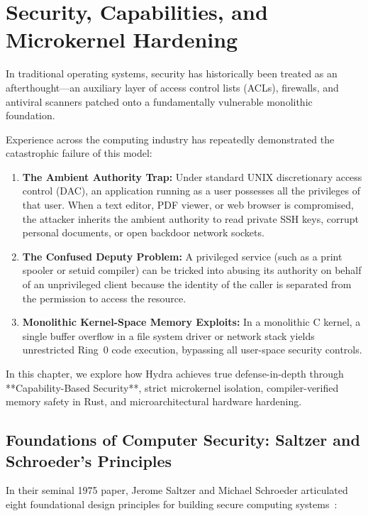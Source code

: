 \chapter{Security, Capabilities, and Microkernel Hardening}
\label{chap:security}

In traditional operating systems, security has historically been treated as an afterthought---an auxiliary layer of access control lists (ACLs), firewalls, and antiviral scanners patched onto a fundamentally vulnerable monolithic foundation.

Experience across the computing industry has repeatedly demonstrated the catastrophic failure of this model:
\begin{enumerate}
    \item \textbf{The Ambient Authority Trap:} Under standard UNIX discretionary access control (DAC), an application running as a user possesses all the privileges of that user. When a text editor, PDF viewer, or web browser is compromised, the attacker inherits the ambient authority to read private SSH keys, corrupt personal documents, or open backdoor network sockets.
    \item \textbf{The Confused Deputy Problem:} A privileged service (such as a print spooler or setuid compiler) can be tricked into abusing its authority on behalf of an unprivileged client because the identity of the caller is separated from the permission to access the resource.
    \item \textbf{Monolithic Kernel-Space Memory Exploits:} In a monolithic C kernel, a single buffer overflow in a file system driver or network stack yields unrestricted Ring~0 code execution, bypassing all user-space security controls.
\end{enumerate}

In this chapter, we explore how Hydra achieves true defense-in-depth through **Capability-Based Security**, strict microkernel isolation, compiler-verified memory safety in Rust, and microarchitectural hardware hardening.

\section{Foundations of Computer Security: Saltzer and Schroeder's Principles}
\label{sec:saltzer_schroeder}

In their seminal 1975 paper, Jerome Saltzer and Michael Schroeder articulated eight foundational design principles for building secure computing systems~\cite{saltzer1975protection}:

